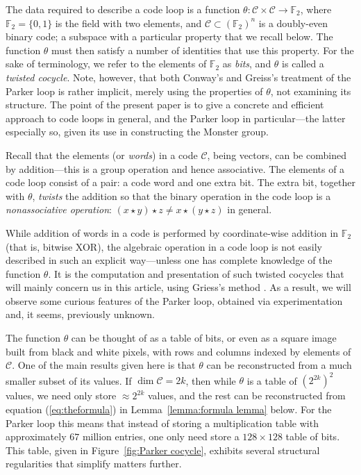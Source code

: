 \documentclass{article}
\theoremstyle{plain}
\theoremstyle{definition}
\def \cC {\mathcal{C}}
\def \FF {\mathbb{F}}
\begin{document}
The data required to describe a code loop is a function $\theta\colon \cC\times \cC \to \FF_2$, where $\FF_2 = \{0,1\}$ is the field with two elements, and $\cC\subset (\FF_2)^n$ is a doubly-even binary code; a subspace with a particular property that we recall below. 
The function $\theta$ must then satisfy a number of identities that use this property.
For the sake of terminology, we refer to the elements of $\FF_2$ as \emph{bits}, and $\theta$ is called a \emph{twisted cocycle}.
Note, however, that both Conway's and Greiss's treatment of the Parker loop is rather implicit, merely using the properties of $\theta$, not examining its structure. 
The point of the present paper is to give a concrete and efficient approach to code loops in general, and the Parker loop in particular---the latter especially so, given its use in constructing the Monster group.

Recall that the elements (or \emph{words}) in a code $\cC$, being vectors, can be combined by addition---this is a group operation and hence associative. 
The elements of a code loop consist of a pair: a code word and one extra bit.
The extra bit, together with $\theta$, \emph{twists} the addition so that the binary operation in the code loop is a \emph{nonassociative operation}: $(x\star y)\star z\not=x\star (y\star z)$ in general.

While addition of words in a code is performed by coordinate-wise addition in $\FF_2$ (that is, bitwise XOR), the algebraic operation in a code loop is not easily described in such an explicit way---unless one has complete knowledge of the function $\theta$.
It is the computation and presentation of such twisted cocycles that will mainly concern us in this article, using Griess's method \cite[proof of Theorem 10]{Griess}.
As a result, we will observe some curious features of the Parker loop, obtained via experimentation and, it seems, previously unknown.

The function $\theta$ can be thought of as a table of bits, or even as a square image built from black and white pixels, with rows and columns indexed by elements of $\cC$. 
One of the main results given here is that $\theta$ can be reconstructed from a much smaller subset of its values. 
If $\dim\cC = 2k$, then while $\theta$ is a table of $(2^{2k})^2$ values, we need only store $\approx 2^{2k}$ values, and the rest can be reconstructed from equation (\ref{eq:theformula}) in Lemma~\ref{lemma:formula lemma} below. 
For the Parker loop this means that instead of storing a multiplication table with approximately $67$ million entries, one only need store a $128\times 128$ table of bits. 
This table, given in Figure~\ref{fig:Parker cocycle}, exhibits several structural regularities that simplify matters further.
\end{document}
